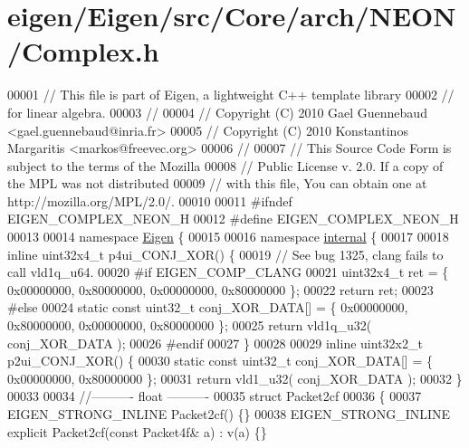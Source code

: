 \hypertarget{eigen_2_eigen_2src_2_core_2arch_2_n_e_o_n_2_complex_8h_source}{}\section{eigen/\+Eigen/src/\+Core/arch/\+N\+E\+O\+N/\+Complex.h}
\label{eigen_2_eigen_2src_2_core_2arch_2_n_e_o_n_2_complex_8h_source}

\begin{DoxyCode}
00001 \textcolor{comment}{// This file is part of Eigen, a lightweight C++ template library}
00002 \textcolor{comment}{// for linear algebra.}
00003 \textcolor{comment}{//}
00004 \textcolor{comment}{// Copyright (C) 2010 Gael Guennebaud <gael.guennebaud@inria.fr>}
00005 \textcolor{comment}{// Copyright (C) 2010 Konstantinos Margaritis <markos@freevec.org>}
00006 \textcolor{comment}{//}
00007 \textcolor{comment}{// This Source Code Form is subject to the terms of the Mozilla}
00008 \textcolor{comment}{// Public License v. 2.0. If a copy of the MPL was not distributed}
00009 \textcolor{comment}{// with this file, You can obtain one at http://mozilla.org/MPL/2.0/.}
00010 
00011 \textcolor{preprocessor}{#ifndef EIGEN\_COMPLEX\_NEON\_H}
00012 \textcolor{preprocessor}{#define EIGEN\_COMPLEX\_NEON\_H}
00013 
00014 \textcolor{keyword}{namespace }\hyperlink{namespace_eigen}{Eigen} \{
00015 
00016 \textcolor{keyword}{namespace }\hyperlink{namespaceinternal}{internal} \{
00017 
00018 \textcolor{keyword}{inline} uint32x4\_t p4ui\_CONJ\_XOR() \{
00019 \textcolor{comment}{// See bug 1325, clang fails to call vld1q\_u64.}
00020 \textcolor{preprocessor}{#if EIGEN\_COMP\_CLANG}
00021   uint32x4\_t ret = \{ 0x00000000, 0x80000000, 0x00000000, 0x80000000 \};
00022   \textcolor{keywordflow}{return} ret;
00023 \textcolor{preprocessor}{#else}
00024   \textcolor{keyword}{static} \textcolor{keyword}{const} uint32\_t conj\_XOR\_DATA[] = \{ 0x00000000, 0x80000000, 0x00000000, 0x80000000 \};
00025   \textcolor{keywordflow}{return} vld1q\_u32( conj\_XOR\_DATA );
00026 \textcolor{preprocessor}{#endif}
00027 \}
00028 
00029 \textcolor{keyword}{inline} uint32x2\_t p2ui\_CONJ\_XOR() \{
00030   \textcolor{keyword}{static} \textcolor{keyword}{const} uint32\_t conj\_XOR\_DATA[] = \{ 0x00000000, 0x80000000 \};
00031   \textcolor{keywordflow}{return} vld1\_u32( conj\_XOR\_DATA );
00032 \}
00033 
00034 \textcolor{comment}{//---------- float ----------}
00035 \textcolor{keyword}{struct }Packet2cf
00036 \{
00037   EIGEN\_STRONG\_INLINE Packet2cf() \{\}
00038   EIGEN\_STRONG\_INLINE \textcolor{keyword}{explicit} Packet2cf(\textcolor{keyword}{const} Packet4f& a) : v(a) \{\}

\end{DoxyCode}
